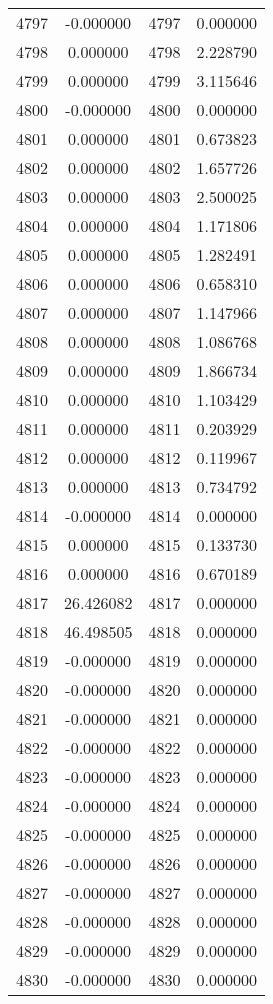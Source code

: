 \documentclass[12pt]{article}
\begin{document}
\begin{longtable}{@{}cccc@{}}
4797 & -0.000000 & 4797 & 0.000000 \\
4798 & 0.000000 & 4798 & 2.228790 \\
4799 & 0.000000 & 4799 & 3.115646 \\
4800 & -0.000000 & 4800 & 0.000000 \\
4801 & 0.000000 & 4801 & 0.673823 \\
4802 & 0.000000 & 4802 & 1.657726 \\
4803 & 0.000000 & 4803 & 2.500025 \\
4804 & 0.000000 & 4804 & 1.171806 \\
4805 & 0.000000 & 4805 & 1.282491 \\
4806 & 0.000000 & 4806 & 0.658310 \\
4807 & 0.000000 & 4807 & 1.147966 \\
4808 & 0.000000 & 4808 & 1.086768 \\
4809 & 0.000000 & 4809 & 1.866734 \\
4810 & 0.000000 & 4810 & 1.103429 \\
4811 & 0.000000 & 4811 & 0.203929 \\
4812 & 0.000000 & 4812 & 0.119967 \\
4813 & 0.000000 & 4813 & 0.734792 \\
4814 & -0.000000 & 4814 & 0.000000 \\
4815 & 0.000000 & 4815 & 0.133730 \\
4816 & 0.000000 & 4816 & 0.670189 \\
4817 & 26.426082 & 4817 & 0.000000 \\
4818 & 46.498505 & 4818 & 0.000000 \\
4819 & -0.000000 & 4819 & 0.000000 \\
4820 & -0.000000 & 4820 & 0.000000 \\
4821 & -0.000000 & 4821 & 0.000000 \\
4822 & -0.000000 & 4822 & 0.000000 \\
4823 & -0.000000 & 4823 & 0.000000 \\
4824 & -0.000000 & 4824 & 0.000000 \\
4825 & -0.000000 & 4825 & 0.000000 \\
4826 & -0.000000 & 4826 & 0.000000 \\
4827 & -0.000000 & 4827 & 0.000000 \\
4828 & -0.000000 & 4828 & 0.000000 \\
4829 & -0.000000 & 4829 & 0.000000 \\
4830 & -0.000000 & 4830 & 0.000000 \\

\end{longtable}
\end{document}
